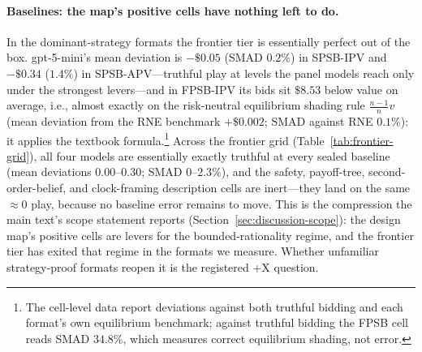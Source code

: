 \paragraph{Baselines: the map's positive cells have nothing left to do.}
In the dominant-strategy formats the frontier tier is essentially perfect out of the box. gpt-5-mini's mean deviation is $-\$0.05$ (SMAD $0.2\%$) in SPSB-IPV and $-\$0.34$ ($1.4\%$) in SPSB-APV---truthful play at levels the panel models reach only under the strongest levers---and in FPSB-IPV its bids sit $\$8.53$ below value on average, i.e., almost exactly on the risk-neutral equilibrium shading rule $\frac{n-1}{n}v$ (mean deviation from the RNE benchmark $+\$0.002$; SMAD against RNE $0.1\%$): it applies the textbook formula.\footnote{The cell-level data report deviations against both truthful bidding and each format's own equilibrium benchmark; against truthful bidding the FPSB cell reads SMAD $34.8\%$, which measures correct equilibrium shading, not error.} Across the frontier grid (Table~\ref{tab:frontier-grid}), all four models are essentially exactly truthful at every sealed baseline (mean deviations $0.00$--$0.30$; SMAD $0$--$2.3\%$), and the safety, payoff-tree, second-order-belief, and clock-framing description cells are inert---they land on the same $\approx 0$ play, because no baseline error remains to move. This is the compression the main text's scope statement reports (Section~\ref{sec:discussion-scope}): the design map's positive cells are levers for the bounded-rationality regime, and the frontier tier has exited that regime in the formats we measure. Whether unfamiliar strategy-proof formats reopen it is the registered +X question. 

